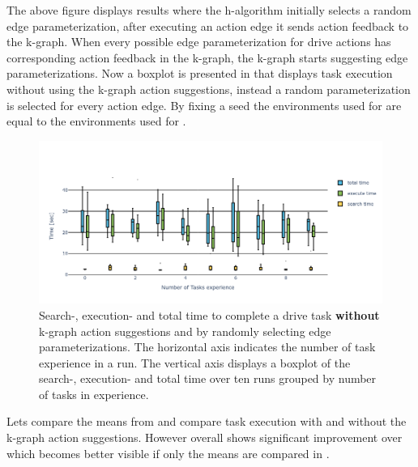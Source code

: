 The above figure displays results where the \ac{h-algorithm} initially selects a random edge parameterization, after executing an action edge it sends action feedback to the \ac{k-graph}. When every possible edge parameterization for drive actions has corresponding action feedback in the \ac{k-graph}, the \ac{k-graph} starts suggesting edge parameterizations. Now a boxplot is presented in  that displays task execution without using the \ac{k-graph} action suggestions, instead a random parameterization is selected for every action edge. By fixing a seed the environments used for  are equal to the environments used for .\bs

\begin{figure}[H]
    \centering
    \includegraphics[width=\textwidth]{figures/results/random_drive_time_no_k-graph}
    \caption{Search-, execution- and total time to complete a drive task \textbf{without} \ac{k-graph} action suggestions and by randomly selecting edge parameterizations. The horizontal axis indicates the number of task experience in a run. The vertical axis displays a boxplot of the search-, execution- and total time over ten runs grouped by number of tasks in experience. }%
   \label{fig:random_drive_time_no_k-graph}
\end{figure}

Lets compare the means from  and compare task execution with and without the \ac{k-graph} action suggestions. However overall  shows significant improvement over  which becomes better visible if only the means are compared in .\bs

